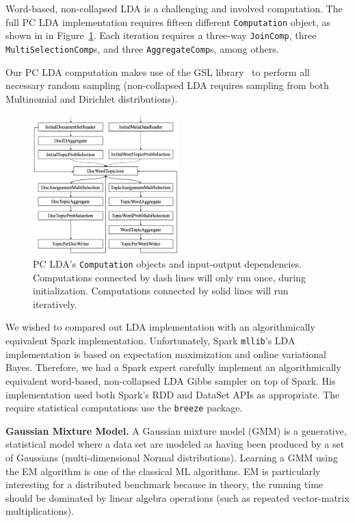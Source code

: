 Word-based,
non-collapsed LDA is a challenging and involved computation.
The full PC LDA implementation requires fifteen different \texttt{Computation} object, as shown in 
in Figure~\ref{fig:lda-query-graph}.  Each iteration requires a 
three-way \texttt{JoinComp}, three \texttt{MultiSelectionComp}s, and three
\texttt{AggregateComp}s, among others. 

Our PC LDA computation makes use of the GSL library~\cite{gsl} to perform all necessary random sampling (non-collapsed LDA requires 
sampling from both Multinomial and Dirichlet distributions).

\begin{figure}
\centering
\includegraphics[width=0.5\textwidth]{lda-query-graph.pdf}
  \caption{\label{fig:lda-query-graph} PC LDA's \texttt{Computation} objects and input-output dependencies. Computations
    connected by dash lines will only run once, during  
    initialization. Computations connected by solid lines will run iteratively.}
\end{figure}

We wished to compared out LDA implementation with an algorithmically equivalent Spark implementation.  Unfortunately,
Spark \texttt{mllib}'s LDA implementation is based on expectation
maximization and online variational Bayes.
Therefore, we had a Spark expert 
carefully implement an algorithmically
equivalent word-based, non-collapsed LDA Gibbs sampler on top of Spark.  His implementation used both
Spark's RDD and DataSet        
APIs as appropriate.
The require statistical computations use the
\texttt{breeze} package. 


\vspace{5pt}
\noindent
\textbf{Gaussian Mixture Model.} A Gaussian mixture model (GMM) is a generative, statistical model where a data set are modeled
as having been produced by a set of Gaussians (multi-dimensional Normal distributions). Learning a GMM using
the EM algorithm is one of the classical ML algorithms.
EM is particularly interesting for a distributed benchmark because in theory, the running time should be dominated
by linear algebra operations (such as repeated vector-matrix multiplications).

